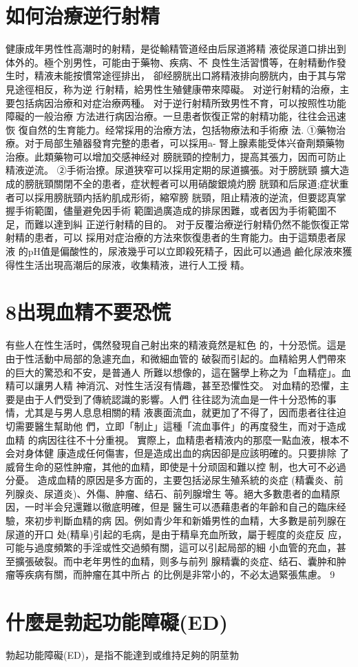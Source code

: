 \documentclass[12pt,UTF8]{ctexbook}
\begin{document}
\section{如何治療逆行射精}
健康成年男性性高潮时的射精，是從輸精管道经由后尿道將精
液從尿道口排出到体外的。極个別男性，可能由于藥物、疾病、不
良性生活習慣等，在射精動作發生时，精液未能按慣常途徑排出，
卻经膀胱出口將精液排向膀胱内，由于其与常見途徑相反，称为逆
行射精，給男性生殖健康帶來障礙。
对逆行射精的治療，主要包括病因治療和对症治療两種。
对于逆行射精所致男性不育，可以按照性功能障礙的一般治療
方法进行病因治療。一旦患者恢復正常的射精功能，往往会迅速恢
復自然的生育能力。经常採用的治療方法，包括物療法和手術療
法.
①藥物治療。对于局部生殖器發育完整的患者，可以採用a-
腎上腺素能受体兴奋劑類藥物治療。此類藥物可以增加交感神经对
膀胱頸的控制力，提高其張力，因而可防止精液逆流。
②手術治撩。尿道狭窄可以採用定期的尿道擴張。对于膀胱頸
擴大造成的膀胱頸關閉不全的患者，症状輕者可以用硝酸銀燒灼膀
胱頸和后尿道;症状重者可以採用膀胱頸内括約肌成形術，縮窄膀
胱頸，阻止精液的逆流，但要認真掌握手術範圍，儘量避免因手術
範圍過廣造成的排尿困難，或者因为手術範圍不足，而難以達到糾
正逆行射精的目的。
对于反覆治療逆行射精仍然不能恢復正常射精的患者，可以
採用对症治療的方法來恢復患者的生育能力。由于這類患者尿液
的pH值是偏酸性的，尿液幾乎可以立即殺死精子，因此可以通過
鹼化尿液來獲得性生活出現高潮后的尿液，收集精液，进行人工授
精。
\section{8出現血精不要恐慌}
有些人在性生活时，偶然發現自己射出來的精液竟然是紅色
的，十分恐慌。這是由于性活動中局部的急遽充血，和微細血管的
破裂而引起的。血精給男人們帶來的巨大的驚恐和不安，是普通人
所難以想像的，這在醫學上称之为「血精症」。血精可以讓男人精
神消沉、对性生活沒有情趣，甚至恐懼性交。
对血精的恐懼，主要是由于人們受到了傳統認識的影響。人們
往往認为流血是一件十分恐怖的事情，尤其是与男人息息相關的精
液裹面流血，就更加了不得了，因而患者往往迫切需要醫生幫助他
們，立即「制止」這種「流血事件」的再度發生，而对于造成血精
的病因往往不十分重視。
實際上，血精患者精液内的那麼一點血液，根本不会对身体健
康造成任何傷害，但是造成出血的病因卻是应該明確的。只要排除
了威脅生命的惡性肿瘤，其他的血精，即使是十分顽固和難以控
制，也大可不必過分憂。
造成血精的原因是多方面的，主要包括泌尿生殖系統的炎症
(精囊炎、前列腺炎、尿道炎)、外傷、肿瘤、结石、前列腺增生
等。絕大多數患者的血精原因，一时半会兒還難以徹底明確，但是
醫生可以憑藉患者的年齡和自己的臨床经驗，來初步判斷血精的病
因。例如青少年和新婚男性的血精，大多數是前列腺在尿道的开口
处(精阜)引起的毛病，是由于精阜充血所致，屬于輕度的炎症反
应，可能与過度頻繁的手淫或性交過頻有關，這可以引起局部的細
小血管的充血，甚至擴張破裂。而中老年男性的血精，则多与前列
腺精囊的炎症、结石、囊肿和肿瘤等疾病有關，而肿瘤在其中所占
的比例是非常小的，不必太過緊張焦慮。
9\section{什麼是勃起功能障礙(ED)}
勃起功能障礙(ED)，是指不能達到或维持足夠的阴莖勃
\end{document}
